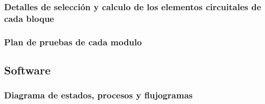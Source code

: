   \newpage


  \subsubsection{Detalles de selección y calculo de los elementos circuitales de cada bloque}  

  \newpage



  \subsubsection{Plan de pruebas de cada modulo}  

  \newpage



  \subsection{Software}  

  \newpage



  \subsubsection{Diagrama de estados, procesos y flujogramas}  

  \newpage




